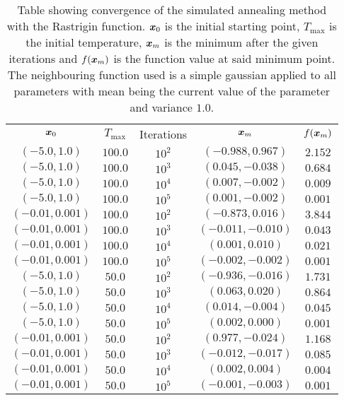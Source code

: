         \begin{table}[H]
            \centering
            \setlength{\tabcolsep}{23.0pt}
            \renewcommand*{\arraystretch}{0.72}
            \caption{Table showing convergence of the simulated annealing
            method with the Rastrigin function. $\boldsymbol{{x}}_0$ is the initial
            starting point, $T_{\text{max}}$ is the initial temperature,
            $\boldsymbol{{x}}_m$ is the minimum after the given iterations and
            $f(\boldsymbol{{x}}_m)$ is the function value at said minimum point. The
            neighbouring function used is a simple gaussian applied to all
            parameters with mean being the current value of the parameter and
            variance $1.0$.}
            \label{tab:rastriginconv}
            \begin{tabular}{ccccc} \hline\hline
                $\boldsymbol{{x}}_0$ & $T_{\text{max}}$ & Iterations & $\boldsymbol{{x}}_m$ & $f(\boldsymbol{{x}}_m)$ \\
                $(-5.0,1.0)$ & $100.0$ & $10^2$ & $(-0.988,0.967)$ & $2.152$ \\
                $(-5.0,1.0)$ & $100.0$ & $10^3$ & $(0.045,-0.038)$ & $0.684$ \\
                $(-5.0,1.0)$ & $100.0$ & $10^4$ & $(0.007,-0.002)$ & $0.009$ \\
                $(-5.0,1.0)$ & $100.0$ & $10^5$ & $(0.001,-0.002)$ & $0.001$ \\
                $(-0.01,0.001)$ & $100.0$ & $10^2$ & $(-0.873,0.016)$ & $3.844$ \\
                $(-0.01,0.001)$ & $100.0$ & $10^3$ & $(-0.011,-0.010)$ & $0.043$ \\
                $(-0.01,0.001)$ & $100.0$ & $10^4$ & $(0.001,0.010)$ & $0.021$ \\
                $(-0.01,0.001)$ & $100.0$ & $10^5$ & $(-0.002,-0.002)$ & $0.001$ \\
                $(-5.0,1.0)$ & $50.0$ & $10^2$ & $(-0.936,-0.016)$ & $1.731$ \\
                $(-5.0,1.0)$ & $50.0$ & $10^3$ & $(0.063,0.020)$ & $0.864$ \\
                $(-5.0,1.0)$ & $50.0$ & $10^4$ & $(0.014,-0.004)$ & $0.045$ \\
                $(-5.0,1.0)$ & $50.0$ & $10^5$ & $(0.002,0.000)$ & $0.001$ \\
                $(-0.01,0.001)$ & $50.0$ & $10^2$ & $(0.977,-0.024)$ & $1.168$ \\
                $(-0.01,0.001)$ & $50.0$ & $10^3$ & $(-0.012,-0.017)$ & $0.085$ \\
                $(-0.01,0.001)$ & $50.0$ & $10^4$ & $(0.002,0.004)$ & $0.004$ \\
                $(-0.01,0.001)$ & $50.0$ & $10^5$ & $(-0.001,-0.003)$ & $0.001$ \\ \hline\hline
            \end{tabular}
        \end{table}

